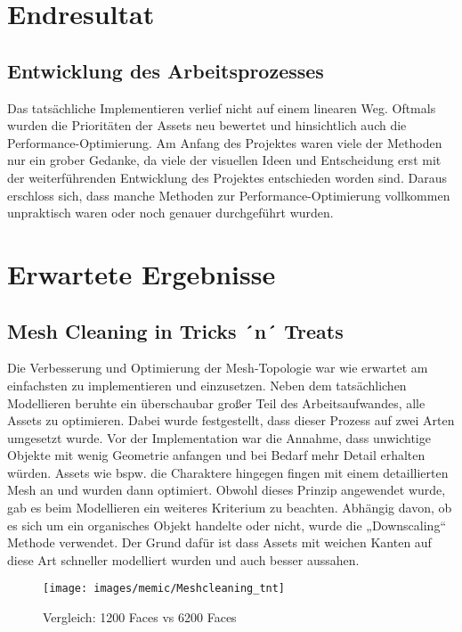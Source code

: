 \section{Endresultat}

\subsection{Entwicklung des Arbeitsprozesses}

Das tatsächliche Implementieren verlief nicht auf einem linearen Weg. Oftmals wurden die Prioritäten der Assets neu bewertet und hinsichtlich auch die Performance-Optimierung. Am Anfang des Projektes waren viele der Methoden nur ein grober Gedanke, da viele der visuellen Ideen und Entscheidung erst mit der weiterführenden Entwicklung des Projektes entschieden worden sind.
Daraus erschloss sich, dass manche Methoden zur Performance-Optimierung vollkommen unpraktisch waren oder noch genauer durchgeführt wurden.

\section{Erwartete Ergebnisse}

\subsection{Mesh Cleaning in Tricks ´n´ Treats}
Die Verbesserung und Optimierung der Mesh-Topologie war wie erwartet am einfachsten zu implementieren und einzusetzen. Neben dem tatsächlichen Modellieren beruhte ein überschaubar großer Teil des Arbeitsaufwandes, alle Assets zu optimieren.
Dabei wurde festgestellt, dass dieser Prozess auf zwei Arten umgesetzt wurde. Vor der Implementation war die Annahme, dass unwichtige Objekte mit wenig Geometrie anfangen und bei Bedarf mehr Detail erhalten würden. Assets wie bspw. die Charaktere hingegen fingen mit einem detaillierten Mesh an und wurden dann optimiert. Obwohl dieses Prinzip angewendet wurde, gab es beim Modellieren ein weiteres Kriterium zu beachten. Abhängig davon, ob es sich um ein organisches Objekt handelte oder nicht, wurde die „Downscaling“ Methode verwendet. Der Grund dafür ist dass Assets mit weichen Kanten auf diese Art schneller modelliert wurden und auch besser aussahen.

\begin{figure}[H]
	\centering
	\texttt{[image: images/memic/Meshcleaning\_tnt]}
	\caption{Vergleich: 1200 Faces vs 6200 Faces}
\end{figure}

